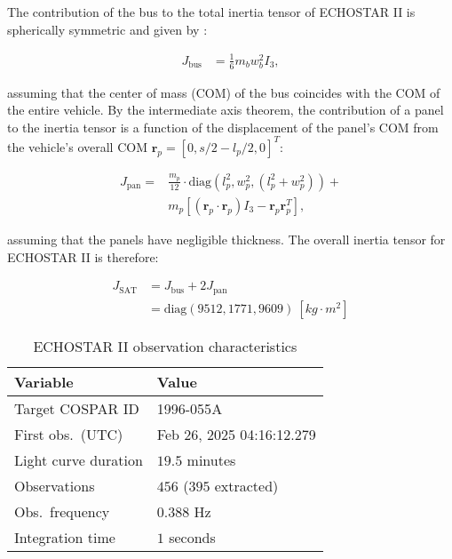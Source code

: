 \documentclass[a4paper,twocolumn]{spaceDebrisC} %
\newcommand{\vctr}[1]{\bm{#1}}
\begin{document}
The contribution of the bus to the total inertia tensor of ECHOSTAR II is spherically symmetric and given by \cite{satterly1958}:

\begin{align}
 J_\text{bus} &= \frac{1}{6} m_b w_b^2 I_3,
\end{align}

\noindent
assuming that the center of mass (COM) of the bus coincides with the COM of the entire vehicle. By the intermediate axis theorem, the contribution of a panel to the inertia tensor is a function of the displacement of the panel's COM from the vehicle's overall COM $\vctr{r}_p = [ 0, s/2 - l_p/2, 0]^T$:

\begin{equation}
  \begin{split}
 J_\text{pan} = &\frac{m_p}{12} \cdot \text{diag}\left(l_p^2, w_p^2, \left(l_p^2 + w_p^2\right) \right) + \\&m_p \left[ \left( \vctr{r}_p \cdot \vctr{r}_p \right) I_3 - \vctr{r}_p \vctr{r}_p^T \right],
  \end{split}
\end{equation}

\noindent
assuming that the panels have negligible thickness. The overall inertia tensor for ECHOSTAR II is therefore:

\begin{align}
 J_\text{SAT} &= J_\text{bus} + 2J_\text{pan} \\
  &= \text{diag} \left( 9512, 1771, 9609 \right) \: [kg \cdot m^2]
\end{align}


\begin{table}[H]
  \centering
  \caption{ECHOSTAR II observation characteristics}
  \vspace*{6pt}
  \begin{tabular}{|l|l|}
  \hline
  \textbf{Variable} & \textbf{Value} \\ \hline
 Target COSPAR ID & 1996-055A \\ \hline
 First obs.\ (UTC) & Feb 26, 2025 04:16:12.279 \\ \hline
 Light curve duration & $19.5$ minutes \\ \hline
 Observations & $456$ ($395$ extracted) \\ \hline
 Obs.\ frequency & $0.388$ Hz \\ \hline
 Integration time & $1$ seconds \\ \hline
  \end{tabular}
  \label{tb:case2_in}
\end{table}
\end{document}
